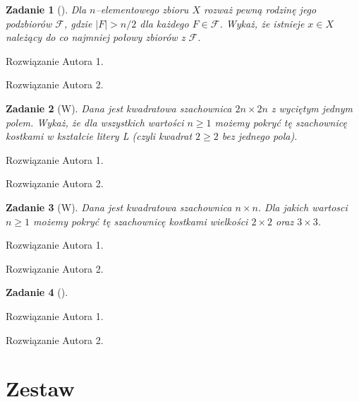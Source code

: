 \documentclass{mwart}
\newtheorem{zad}{Zadanie}[section]
\begin{document}
\begin{zad}[]
    Dla $n$--elementowego zbioru $X$ rozważ pewną rodzinę jego podzbiorów
    $\mathcal{F}$, gdzie $|F| > n/2$ dla każdego $F \in \mathcal{F}$. Wykaż, że istnieje
    $x \in X$ należący do co najmniej połowy zbiorów z $\mathcal{F}$.
\end{zad}
\begin{mdframed}
    Rozwiązanie Autora 1.
\end{mdframed}
\begin{mdframed}
    Rozwiązanie Autora 2.
\end{mdframed}




\begin{zad}[W]
    Dana jest kwadratowa szachownica $2n \times 2n$ z wyciętym jednym polem.
    Wykaż, że dla wszystkich wartości $n \geq 1$ możemy pokryć tę szachownicę kostkami w
    kształcie litery L (czyli kwadrat $2 \geq 2$ bez jednego pola).
\end{zad}
\begin{mdframed}
    Rozwiązanie Autora 1.
\end{mdframed}
\begin{mdframed}
    Rozwiązanie Autora 2.
\end{mdframed}

\begin{zad}[W]
    Dana jest kwadratowa szachownica $n \times n$. Dla jakich wartosci $n\geq 1$
    możemy pokryć tę szachownicę kostkami wielkości $2 \times 2$ oraz $3 \times 3$.
\end{zad}
\begin{mdframed}
    Rozwiązanie Autora 1.
\end{mdframed}
\begin{mdframed}
    Rozwiązanie Autora 2.
\end{mdframed}




\begin{zad}[]

\end{zad}
\begin{mdframed}
    Rozwiązanie Autora 1.
\end{mdframed}
\begin{mdframed}
    Rozwiązanie Autora 2.
\end{mdframed}








\newpage
\section{Zestaw}          %
\end{document}

